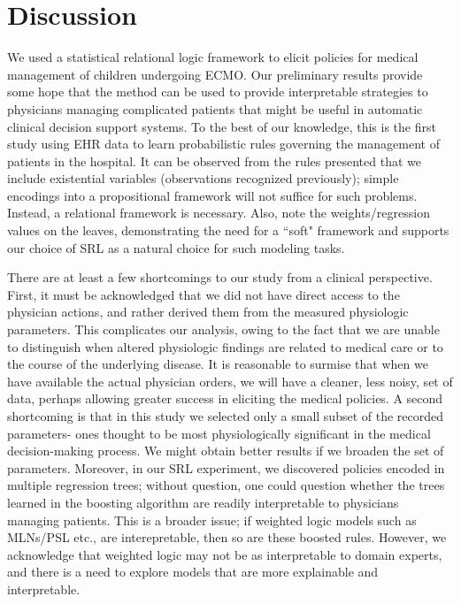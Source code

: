 \documentclass[letterpaper]{article} %
\begin{document}
\section{Discussion}
We used a statistical relational logic framework to elicit policies for medical management of children undergoing ECMO. Our preliminary results provide some hope that the method can be used to provide interpretable strategies to physicians managing complicated patients that might be useful in automatic clinical decision support systems. To the best of our knowledge, this is the first study using EHR data to learn probabilistic rules governing the management of patients in the hospital. It can be observed from the rules presented that we include existential variables (observations recognized previously); simple encodings into a propositional framework will not suffice for such problems. Instead, a relational framework is necessary. Also, note the weights/regression values on the leaves, demonstrating the need for a ``soft" framework and supports our choice of SRL as a natural choice for such modeling tasks.

There are at least a few shortcomings to our study from a clinical perspective. First, it must be acknowledged that we did not have direct access to the physician actions, and rather derived them from the measured physiologic parameters. This complicates our analysis, owing to the fact that we are unable to distinguish when altered physiologic findings are related to medical care or to the course of the underlying disease. It is reasonable to surmise that when we have available the actual physician orders, we will have a cleaner, less noisy, set of data, perhaps allowing greater success in eliciting the medical policies. A second shortcoming is that in this study we selected only a small subset of the recorded parameters- ones thought to be most physiologically significant in the medical decision-making process. We might obtain better results if we broaden the set of parameters. Moreover, in our SRL experiment, we discovered policies encoded in multiple regression trees; without question, one could question whether the trees learned in the boosting algorithm are readily interpretable to physicians managing patients. This is a broader issue; if weighted logic models such as MLNs/PSL etc., are interepretable, then so are these boosted rules. However, we acknowledge that weighted logic may not be as interpretable to domain experts, and there is a need to explore models that are more explainable and interpretable.
\end{document}
